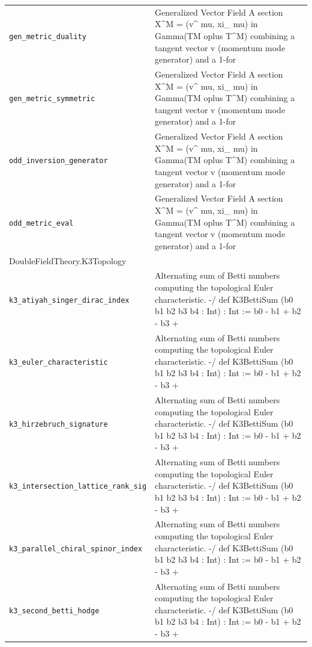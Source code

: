 \begin{longtable}{p{}p{}}
\quad\texttt{\footnotesize gen\_metric\_duality} & {\footnotesize Generalized Vector Field A section X\^{}M = (v\^{} mu,  xi\_ mu)  in  Gamma(TM  oplus T\^{}M) combining a tangent vector v (momentum mode generator) and a 1-for} \\
\quad\texttt{\footnotesize gen\_metric\_symmetric} & {\footnotesize Generalized Vector Field A section X\^{}M = (v\^{} mu,  xi\_ mu)  in  Gamma(TM  oplus T\^{}M) combining a tangent vector v (momentum mode generator) and a 1-for} \\
\quad\texttt{\footnotesize odd\_inversion\_generator} & {\footnotesize Generalized Vector Field A section X\^{}M = (v\^{} mu,  xi\_ mu)  in  Gamma(TM  oplus T\^{}M) combining a tangent vector v (momentum mode generator) and a 1-for} \\
\quad\texttt{\footnotesize odd\_metric\_eval} & {\footnotesize Generalized Vector Field A section X\^{}M = (v\^{} mu,  xi\_ mu)  in  Gamma(TM  oplus T\^{}M) combining a tangent vector v (momentum mode generator) and a 1-for} \\
\multicolumn{2}{l}{\textsf{\small DoubleFieldTheory.K3Topology}} \\
\quad\texttt{\footnotesize k3\_atiyah\_singer\_dirac\_index} & {\footnotesize Alternating sum of Betti numbers computing the topological Euler characteristic. -/ def K3BettiSum (b0 b1 b2 b3 b4 : Int) : Int := b0 - b1 + b2 - b3 +} \\
\quad\texttt{\footnotesize k3\_euler\_characteristic} & {\footnotesize Alternating sum of Betti numbers computing the topological Euler characteristic. -/ def K3BettiSum (b0 b1 b2 b3 b4 : Int) : Int := b0 - b1 + b2 - b3 +} \\
\quad\texttt{\footnotesize k3\_hirzebruch\_signature} & {\footnotesize Alternating sum of Betti numbers computing the topological Euler characteristic. -/ def K3BettiSum (b0 b1 b2 b3 b4 : Int) : Int := b0 - b1 + b2 - b3 +} \\
\quad\texttt{\footnotesize k3\_intersection\_lattice\_rank\_sig} & {\footnotesize Alternating sum of Betti numbers computing the topological Euler characteristic. -/ def K3BettiSum (b0 b1 b2 b3 b4 : Int) : Int := b0 - b1 + b2 - b3 +} \\
\quad\texttt{\footnotesize k3\_parallel\_chiral\_spinor\_index} & {\footnotesize Alternating sum of Betti numbers computing the topological Euler characteristic. -/ def K3BettiSum (b0 b1 b2 b3 b4 : Int) : Int := b0 - b1 + b2 - b3 +} \\
\quad\texttt{\footnotesize k3\_second\_betti\_hodge} & {\footnotesize Alternating sum of Betti numbers computing the topological Euler characteristic. -/ def K3BettiSum (b0 b1 b2 b3 b4 : Int) : Int := b0 - b1 + b2 - b3 +} \\

\end{longtable}
